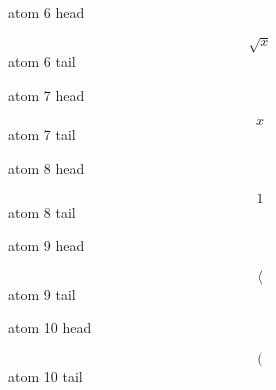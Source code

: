 \documentclass[12pt]{article}
\begin{document}
\noindent atom 6 head\par
\[ \sqrt{x} \]
\noindent atom 6 tail\par
\noindent atom 7 head\par
\[ x \]
\noindent atom 7 tail\par
\noindent atom 8 head\par
\[ 1 \]
\noindent atom 8 tail\par
\noindent atom 9 head\par
\[ \langle \]
\noindent atom 9 tail\par
\noindent atom 10 head\par
\[ \left( \right. \]
\noindent atom 10 tail
\end{document}
